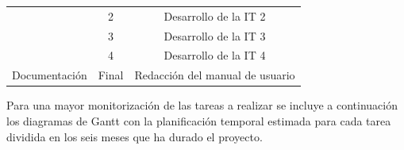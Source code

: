 \documentclass[12pt, a4paper]{book}
\begin{document}
\begin{table}[htbp]
\begin{tabular}{@{}|c|c|c|@{}}
		& 2                           & Desarrollo de la IT 2                                                                                             \\ \cmidrule(l){2-3} 
		& 3                           & Desarrollo de la IT 3                                                                                             \\ \cmidrule(l){2-3} 
		& 4                           & Desarrollo de la IT 4                                                                                             \\ \midrule
		Documentación               & Final                       & Redacción del manual de usuario                                                                                   \\ \bottomrule
	\end{tabular}
\end{table}
\vspace{0.5cm}

Para una mayor monitorización de las tareas a realizar se incluye a continuación los diagramas de Gantt con la planificación temporal estimada para cada tarea dividida en los seis meses que ha durado el proyecto.
\end{document}

